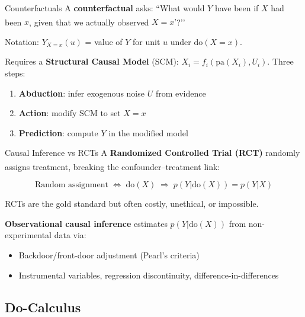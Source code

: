 \begin{v3topic}{Counterfactuals}
    A \textbf{counterfactual} asks: ``What would $Y$ have been if $X$ had been
    $x$, given that we actually observed $X{=}x’$?’’\textsuperscript{\cite[][Ch.~7]{pearlCausalityModelsReasoning2009}}

    Notation: $Y_{X=x}(u)$ = value of $Y$ for unit $u$ under
    $\mathrm{do}(X{=}x)$.

    Requires a \textbf{Structural Causal Model} (SCM):
    $X_i = f_i(\mathrm{pa}(X_i), U_i)$.
    Three steps:
    \begin{enumerate}
        \item \textbf{Abduction}: infer exogenous noise $U$ from evidence
        \item \textbf{Action}: modify SCM to set $X{=}x$
        \item \textbf{Prediction}: compute $Y$ in the modified model
    \end{enumerate}

\end{v3topic}
\begin{v3topic}{Causal Inference vs RCTs}
    A \textbf{Randomized Controlled Trial (RCT)} randomly assigns treatment,
    breaking the confounder--treatment
    link:\textsuperscript{\cite[][Ch.~1]{hernanCausalInferenceWhat2020}}

    \[ \text{Random assignment} \;\Leftrightarrow\; \mathrm{do}(X)
       \;\Rightarrow\; p(Y|\mathrm{do}(X)) = p(Y|X) \]

    RCTs are the gold standard but often costly, unethical, or impossible.

    \textbf{Observational causal inference} estimates $p(Y|\mathrm{do}(X))$
    from non-experimental data via:
    \begin{itemize}
        \item Backdoor/front-door adjustment (Pearl’s criteria)
        \item Instrumental variables, regression discontinuity,
              difference-in-differences
    \end{itemize}

\end{v3topic}

    \subsection{Do-Calculus}

